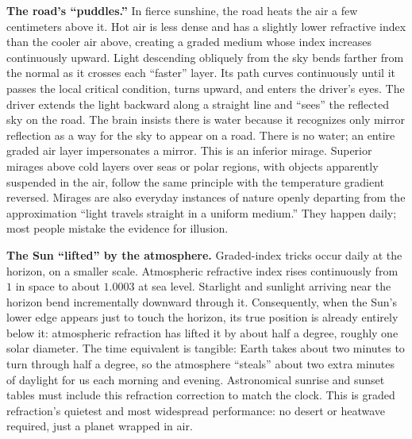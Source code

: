 \textbf{The road's ``puddles.''} In fierce sunshine, the road heats the air a few centimeters above it. Hot air is less dense and has a slightly lower refractive index than the cooler air above, creating a graded medium whose index increases continuously upward. Light descending obliquely from the sky bends farther from the normal as it crosses each ``faster'' layer. Its path curves continuously until it passes the local critical condition, turns upward, and enters the driver's eyes. The driver extends the light backward along a straight line and ``sees'' the reflected sky on the road. The brain insists there is water because it recognizes only mirror reflection as a way for the sky to appear on a road. There is no water; an entire graded air layer impersonates a mirror. This is an inferior mirage. Superior mirages above cold layers over seas or polar regions, with objects apparently suspended in the air, follow the same principle with the temperature gradient reversed. Mirages are also everyday instances of nature openly departing from the approximation ``light travels straight in a uniform medium.'' They happen daily; most people mistake the evidence for illusion.

\textbf{The Sun ``lifted'' by the atmosphere.} Graded-index tricks occur daily at the horizon, on a smaller scale. Atmospheric refractive index rises continuously from \(1\) in space to about \(1.0003\) at sea level. Starlight and sunlight arriving near the horizon bend incrementally downward through it. Consequently, when the Sun's lower edge appears just to touch the horizon, its true position is already entirely below it: atmospheric refraction has lifted it by about half a degree, roughly one solar diameter. The time equivalent is tangible: Earth takes about two minutes to turn through half a degree, so the atmosphere ``steals'' about two extra minutes of daylight for us each morning and evening. Astronomical sunrise and sunset tables must include this refraction correction to match the clock. This is graded refraction's quietest and most widespread performance: no desert or heatwave required, just a planet wrapped in air.

\begin{center}
\end{center}

